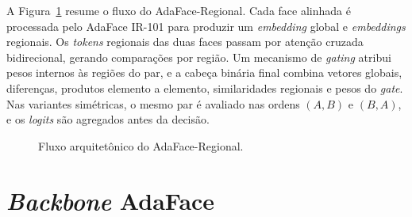 A Figura~\ref{fig:adaface_regional_arquitetura} resume o fluxo do AdaFace-Regional. Cada face alinhada é processada pelo AdaFace IR-101 para produzir um \textit{embedding} global e \textit{embeddings} regionais. Os \textit{tokens} regionais das duas faces passam por atenção cruzada bidirecional, gerando comparações por região. Um mecanismo de \textit{gating} atribui pesos internos às regiões do par, e a cabeça binária final combina vetores globais, diferenças, produtos elemento a elemento, similaridades regionais e pesos do \textit{gate}. Nas variantes simétricas, o mesmo par é avaliado nas ordens $(A,B)$ e $(B,A)$, e os \textit{logits} são agregados antes da decisão.

\begin{figure}[htbp]
\centering
{}
\caption{Fluxo arquitetônico do AdaFace-Regional.}
\label{fig:adaface_regional_arquitetura}
\end{figure}

\section{\textit{Backbone} AdaFace}

